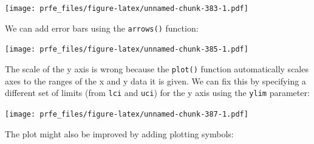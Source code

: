 \documentclass[12pt,a4paper]{book}
\newenvironment{Shaded}{\begin{snugshade}}{\end{snugshade}}
\newcommand{\KeywordTok}[1]{\textcolor[rgb]{0.13,0.29,0.53}{\textbf{#1}}}
\newcommand{\DataTypeTok}[1]{\textcolor[rgb]{0.13,0.29,0.53}{#1}}
\newcommand{\DecValTok}[1]{\textcolor[rgb]{0.00,0.00,0.81}{#1}}
\newcommand{\FloatTok}[1]{\textcolor[rgb]{0.00,0.00,0.81}{#1}}
\newcommand{\StringTok}[1]{\textcolor[rgb]{0.31,0.60,0.02}{#1}}
\newcommand{\OperatorTok}[1]{\textcolor[rgb]{0.81,0.36,0.00}{\textbf{#1}}}
\newcommand{\NormalTok}[1]{#1}
\theoremstyle{definition}
\theoremstyle{definition}
\theoremstyle{definition}
\theoremstyle{remark}
\begin{document}
\texttt{[image: prfe\_files/figure-latex/unnamed-chunk-383-1.pdf]}

We can add error bars using the \texttt{arrows()} function:

\begin{Shaded}
\end{Shaded}

\texttt{[image: prfe\_files/figure-latex/unnamed-chunk-385-1.pdf]}

The scale of the y axis is wrong because the \texttt{plot()} function
automatically scales axes to the ranges of the x and y data it is given.
We can fix this by specifying a different set of limits (from
\texttt{lci} and \texttt{uci}) for the y axis using the \texttt{ylim}
parameter:

\begin{Shaded}
\end{Shaded}

\texttt{[image: prfe\_files/figure-latex/unnamed-chunk-387-1.pdf]}

The plot might also be improved by adding plotting symbols:

\begin{Shaded}
\end{Shaded}
\end{document}
